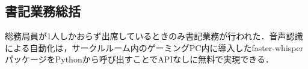 \subsection*{書記業務総括}

総務局員が1人しかおらず出席しているときのみ書記業務が行われた．音声認識による自動化は，サークルルーム内のゲーミングPC内に導入したfaster-whisperパッケージをPythonから呼び出すことでAPIなしに無料で実現できる．


